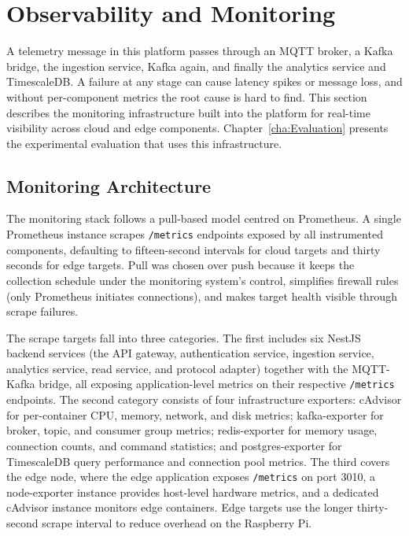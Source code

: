 
\section{Observability and Monitoring}
\label{sec:ProposedModelObservabilityAndMonitoring}

A telemetry message in this platform passes through an \gls{MQTT} broker, a Kafka bridge, the ingestion service, Kafka again, and finally the analytics service and TimescaleDB. A failure at any stage can cause latency spikes or message loss, and without per-component metrics the root cause is hard to find. This section describes the monitoring infrastructure built into the platform for real-time visibility across cloud and edge components. Chapter~\ref{cha:Evaluation} presents the experimental evaluation that uses this infrastructure.

\subsection{Monitoring Architecture}
\label{subsec:MonitoringArchitecture}

The monitoring stack follows a pull-based model centred on Prometheus. A single Prometheus instance scrapes \texttt{/metrics} endpoints exposed by all instrumented components, defaulting to fifteen-second intervals for cloud targets and thirty seconds for edge targets. Pull was chosen over push because it keeps the collection schedule under the monitoring system's control, simplifies firewall rules (only Prometheus initiates connections), and makes target health visible through scrape failures.

The scrape targets fall into three categories. The first includes six NestJS backend services (the \gls{API} gateway, authentication service, ingestion service, analytics service, read service, and protocol adapter) together with the \gls{MQTT}-Kafka bridge, all exposing application-level metrics on their respective \texttt{/metrics} endpoints. The second category consists of four infrastructure exporters: cAdvisor for per-container \gls{CPU}, memory, network, and disk metrics; kafka-exporter for broker, topic, and consumer group metrics; redis-exporter for memory usage, connection counts, and command statistics; and postgres-exporter for TimescaleDB query performance and connection pool metrics. The third covers the edge node, where the edge application exposes \texttt{/metrics} on port 3010, a node-exporter instance provides host-level hardware metrics, and a dedicated cAdvisor instance monitors edge containers. Edge targets use the longer thirty-second scrape interval to reduce overhead on the Raspberry Pi.

